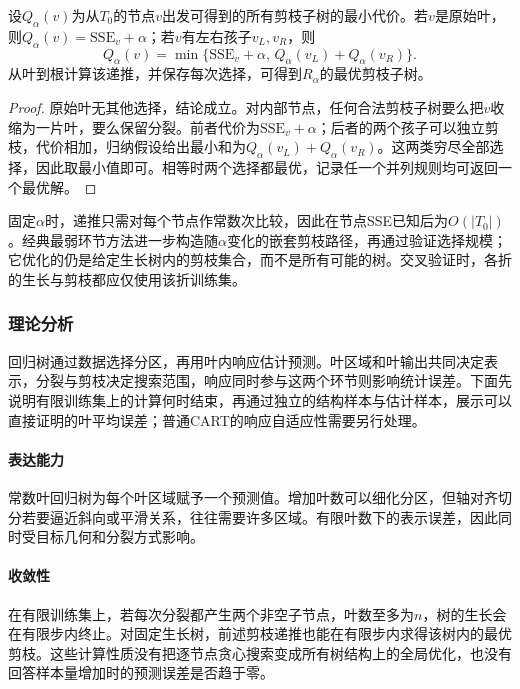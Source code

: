 \begin{theorem}[固定生长树内的最优剪枝]
  \label{thm:regression-pruning}
  设$Q_\alpha(v)$为从$T_0$的节点$v$出发可得到的所有剪枝子树的最小代价。若$v$是原始叶，则$Q_\alpha(v)=\mathrm{SSE}_v+\alpha$；若$v$有左右孩子$v_L,v_R$，则
  \[
    Q_\alpha(v)=\min\{\mathrm{SSE}_v+\alpha,\,
                     Q_\alpha(v_L)+Q_\alpha(v_R)\}.
  \]
  从叶到根计算该递推，并保存每次选择，可得到$R_\alpha$的最优剪枝子树。
\end{theorem}

\begin{proof}
原始叶无其他选择，结论成立。对内部节点，任何合法剪枝子树要么把$v$收缩为一片叶，要么保留分裂。前者代价为$\mathrm{SSE}_v+\alpha$；后者的两个孩子可以独立剪枝，代价相加，归纳假设给出最小和为$Q_\alpha(v_L)+Q_\alpha(v_R)$。这两类穷尽全部选择，因此取最小值即可。相等时两个选择都最优，记录任一个并列规则均可返回一个最优解。
\end{proof}

固定$\alpha$时，递推只需对每个节点作常数次比较，因此在节点SSE已知后为$O(|T_0|)$。经典最弱环节方法进一步构造随$\alpha$变化的嵌套剪枝路径，再通过验证选择规模；它优化的仍是给定生长树内的剪枝集合，而不是所有可能的树。交叉验证时，各折的生长与剪枝都应仅使用该折训练集。

\subsubsection{理论分析}
\label{sec:regression-cart-theory}

回归树通过数据选择分区，再用叶内响应估计预测。叶区域和叶输出共同决定表示，分裂与剪枝决定搜索范围，响应同时参与这两个环节则影响统计误差。下面先说明有限训练集上的计算何时结束，再通过独立的结构样本与估计样本，展示可以直接证明的叶平均误差；普通CART的响应自适应性需要另行处理。

\paragraph{表达能力}
常数叶回归树为每个叶区域赋予一个预测值。增加叶数可以细化分区，但轴对齐切分若要逼近斜向或平滑关系，往往需要许多区域。有限叶数下的表示误差，因此同时受目标几何和分裂方式影响。

\paragraph{收敛性}
在有限训练集上，若每次分裂都产生两个非空子节点，叶数至多为$n$，树的生长会在有限步内终止。对固定生长树，前述剪枝递推也能在有限步内求得该树内的最优剪枝。这些计算性质没有把逐节点贪心搜索变成所有树结构上的全局优化，也没有回答样本量增加时的预测误差是否趋于零。

